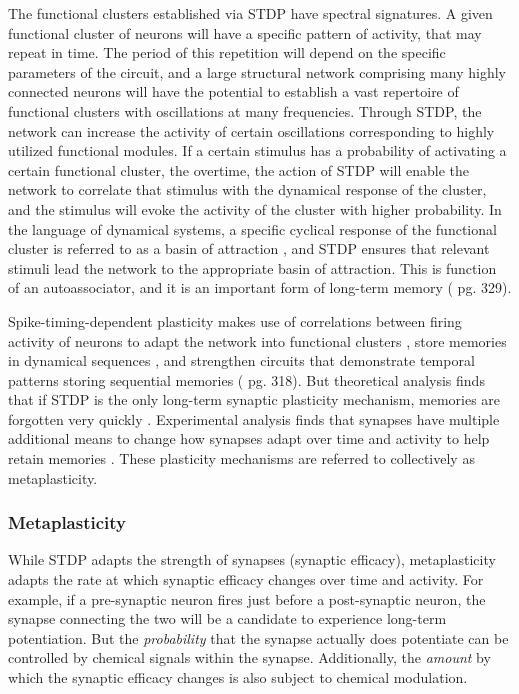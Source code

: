 \documentclass[twocolumn]{article}
\begin{document}
The functional clusters established via STDP have spectral signatures. A given functional cluster of neurons will have a specific pattern of activity, that may repeat in time. The period of this repetition will depend on the specific parameters of the circuit, and a large structural network comprising many highly connected neurons will have the potential to establish a vast repertoire of functional clusters with oscillations at many frequencies. Through STDP, the network can increase the activity of certain oscillations corresponding to highly utilized functional modules. If a certain stimulus has a probability of activating a certain functional cluster, the overtime, the action of STDP will enable the network to correlate that stimulus with the dynamical response of the cluster, and the stimulus will evoke the activity of the cluster with higher probability. In the language of dynamical systems, a specific cyclical response of the functional cluster is referred to as a basin of attraction \cite{iz2007,st2015}, and STDP ensures that relevant stimuli lead the network to the appropriate basin of attraction. This is function of an autoassociator, and it is an important form of long-term memory (\cite{bu2006} pg. 329).

Spike-timing-dependent plasticity makes use of correlations between firing activity of neurons to adapt the network into functional clusters \cite{shki2006}, store memories in dynamical sequences \cite{haah2015}, and strengthen circuits that demonstrate temporal patterns storing sequential memories (\cite{bu2006} pg. 318). But theoretical analysis finds that if STDP is the only long-term synaptic plasticity mechanism, memories are forgotten very quickly \cite{fuab2007}. Experimental analysis finds that synapses have multiple additional means to change how synapses adapt over time and activity to help retain memories \cite{ab2008}. These plasticity mechanisms are referred to collectively as metaplasticity.

\subsubsection{Metaplasticity}
While STDP adapts the strength of synapses (synaptic efficacy), metaplasticity adapts the rate at which synaptic efficacy changes over time and activity. For example, if a pre-synaptic neuron fires just before a post-synaptic neuron, the synapse connecting the two will be a candidate to experience long-term potentiation. But the \textit{probability} that the synapse actually does potentiate can be controlled by chemical signals within the synapse. Additionally, the \textit{amount} by which the synaptic efficacy changes is also subject to chemical modulation. 
\end{document}
